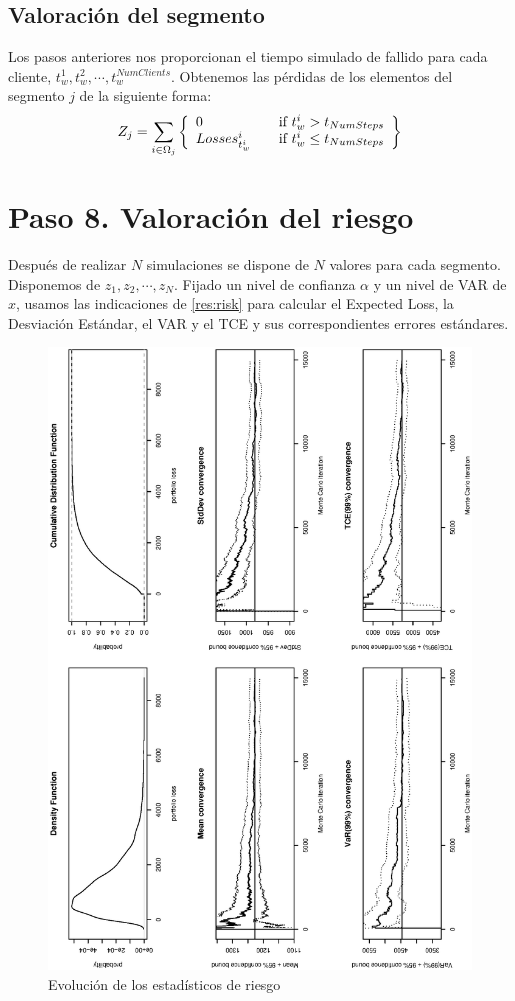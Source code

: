 \subsection{Valoraci\'on del segmento}

Los pasos anteriores nos proporcionan el tiempo simulado de fallido
para cada cliente, $t_w^1, t_w^2, \cdots, t_w^{NumClients}$. Obtenemos 
las p\'erdidas de los elementos del segmento $j$ de la siguiente forma:
\begin{displaymath}
Z_j = \sum_{i \in \Omega_j}
\left\{
\begin{array}{ll}
0                & \quad \textrm{if } t_w^i > t_{NumSteps}    \cr
Losses_{t_w^i}^i & \quad \textrm{if } t_w^i \leq t_{NumSteps} \cr
\end{array}
\right\}
\end{displaymath}


\section{Paso 8. Valoraci\'on del riesgo}

Despu\'es de realizar $N$ simulaciones se dispone de $N$ valores para cada
segmento. Disponemos de $z_1, z_2, \cdots, z_N$. Fijado un nivel de confianza 
$\alpha$ y un nivel de VAR de $x$, usamos las indicaciones de \ref{res:risk} 
para calcular el Expected Loss, la Desviaci\'on Est\'andar, el VAR y el TCE y sus 
correspondientes errores est\'andares.

\begin{figure}[!hb]
\begin{center}
\includegraphics[width=12cm,angle=0]{./images/report.eps}
\caption{Evoluci\'on de los estad\'isticos de riesgo}
\label{timetranches}
\end{center}
\end{figure}
